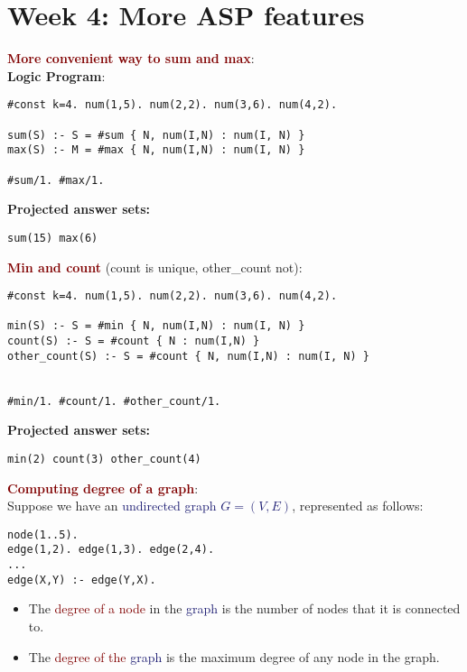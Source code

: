 \section{Week 4: More ASP features}

{\Large \textbf{\textcolor{Maroon}{More convenient way to sum and max}}}: \\
\textbf{Logic Program}:
\begin{lstlisting}
#const k=4. num(1,5). num(2,2). num(3,6). num(4,2).

sum(S) :- S = #sum { N, num(I,N) : num(I, N) }
max(S) :- M = #max { N, num(I,N) : num(I, N) }

#sum/1. #max/1.
\end{lstlisting}

\vspace{0.25cm}

\textbf{Projected answer sets:}
\begin{lstlisting}
sum(15) max(6)
\end{lstlisting}

\vspace{0.35cm}

{\Large \textbf{\textcolor{Maroon}{Min and count}} (count is unique, other\_count not)}:
\begin{lstlisting}
#const k=4. num(1,5). num(2,2). num(3,6). num(4,2).

min(S) :- S = #min { N, num(I,N) : num(I, N) }
count(S) :- S = #count { N : num(I,N) }
other_count(S) :- S = #count { N, num(I,N) : num(I, N) }


#min/1. #count/1. #other_count/1.
\end{lstlisting}

\vspace{0.25cm}

\textbf{Projected answer sets:}
\begin{lstlisting}
min(2) count(3) other_count(4)
\end{lstlisting}

\newpage

{\Large \textbf{\textcolor{Maroon}{Computing degree of a graph}}}: \\
Suppose we have an \textcolor{MidnightBlue}{undirected graph $G = (V,E)$}, represented as follows:
\begin{lstlisting}
node(1..5).
edge(1,2). edge(1,3). edge(2,4).
...
edge(X,Y) :- edge(Y,X).
\end{lstlisting}

\begin{itemize}
    \item The \textcolor{Maroon}{degree of a node} in the \textcolor{MidnightBlue}{graph} is the number of nodes that it is connected to.
    \item The \textcolor{Maroon}{degree of the} \textcolor{MidnightBlue}{graph} is the maximum degree of any node in the graph.
\end{itemize}

